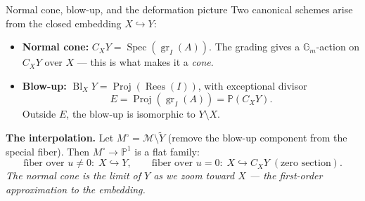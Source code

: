 \documentclass[aspectratio=169,12pt]{beamer}
\begin{document}
\begin{frame}{Normal cone, blow-up, and the deformation picture}
  Two canonical schemes arise from the closed embedding $X \hookrightarrow Y$:

  \medskip

  \begin{itemize}
    \item \textbf{Normal cone:}\enspace
          $C_X Y = \operatorname{Spec}(\operatorname{gr}_I(A))$.
          The grading gives a $\mathbb{G}_m$-action on $C_X Y$ over $X$
          — this is what makes it a \emph{cone}.

    \smallskip

    \item \textbf{Blow-up:}\enspace
          $\operatorname{Bl}_X Y = \operatorname{Proj}(\operatorname{Rees}(I))$,
          with exceptional divisor
          \[
            E = \operatorname{Proj}(\operatorname{gr}_I(A)) = \mathbb{P}(C_X Y).
          \]
          Outside $E$, the blow-up is isomorphic to $Y \setminus X$.
  \end{itemize}

  \medskip

  \textbf{The interpolation.}\enspace
  Let $M^\circ = \mathcal{M} \setminus \widetilde{Y}$
  (remove the blow-up component from the special fiber).
  Then $M^\circ \to \mathbb{P}^1$ is a flat family:
  \[
    \text{fiber over } u \neq 0 :\; X \hookrightarrow Y,
    \qquad
    \text{fiber over } u = 0 :\; X \hookrightarrow C_X Y
    \;(\text{zero section}).
  \]
  \emph{The normal cone is the limit of $Y$ as we zoom toward $X$
  — the first-order approximation to the embedding.}
\end{frame}

\end{document}
